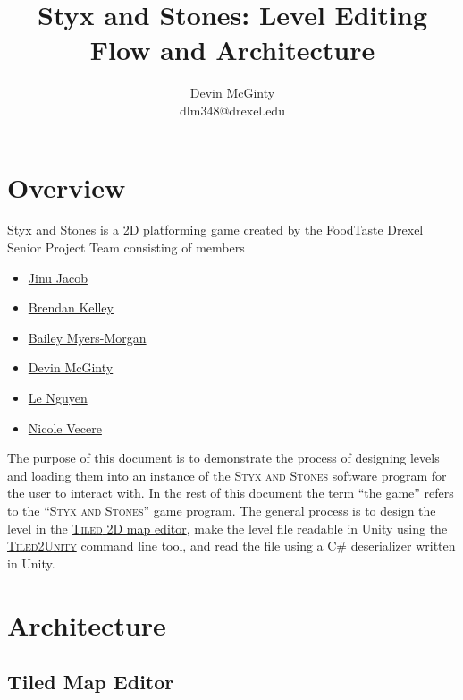 \documentclass{article}
\title{Styx and Stones: Level Editing Flow and Architecture}
\author{
    \large
    Devin McGinty\\
    \normalsize
    dlm348@drexel.edu
}
\begin{document}
\maketitle

\tableofcontents
\newpage

\section{Overview}
Styx and Stones is a 2D platforming game created by the FoodTaste Drexel Senior Project Team consisting of members
\begin{itemize}
    \item \href{mailto:jinu.jacob@drexel.edu}{Jinu Jacob}
    \item \href{mailto:brendan.k.kelley@drexel.edu}{Brendan Kelley}
    \item \href{mailto:bailey.s.myers-morgan@drexel.edu}{Bailey Myers-Morgan}
    \item \href{mailto:dlm348@drexel.edu}{Devin McGinty}
    \item \href{mailto:le.n.nguyen@drexel.edu}{Le Nguyen}
    \item \href{mailto:nicole.m.vecere@drexel.edu}{Nicole Vecere}
\end{itemize}

The purpose of this document is to demonstrate the process of designing levels and loading them into an instance of
the \textsc{Styx and Stones} software program for the user to interact with. In the rest of this document the term
``the game'' refers to the ``\textsc{Styx and Stones}'' game program. The general process is to design the level in the
\href{http://www.mapeditor.org}{\textsc{Tiled} 2D map editor}, make the level file readable in Unity using the
\href{http://www.seanba.com/tiled2unity}{\textsc{Tiled2Unity}} command line tool, and read the file using a C#
deserializer written in Unity.

\section{Architecture}
\subsection{Tiled Map Editor}
\end{document}
